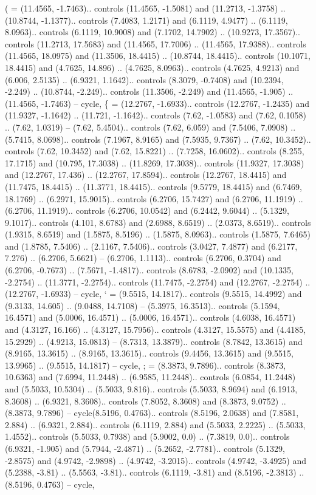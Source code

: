 {(} = {(11.4565, -1.7463).. controls (11.4565, -1.5081) and (11.2713, -1.3758) .. (10.8744, -1.1377).. controls (7.4083, 1.2171) and (6.1119, 4.9477) .. (6.1119, 8.0963).. controls (6.1119, 10.9008) and (7.1702, 14.7902) .. (10.9273, 17.3567).. controls (11.2713, 17.5683) and (11.4565, 17.7006) .. (11.4565, 17.9388).. controls (11.4565, 18.0975) and (11.3506, 18.4415) .. (10.8744, 18.4415).. controls (10.1071, 18.4415) and (4.7625, 14.896) .. (4.7625, 8.0963).. controls (4.7625, 4.9213) and (6.006, 2.5135) .. (6.9321, 1.1642).. controls (8.3079, -0.7408) and (10.2394, -2.249) .. (10.8744, -2.249).. controls (11.3506, -2.249) and (11.4565, -1.905) .. (11.4565, -1.7463) -- cycle},
{\{} = {(12.2767, -1.6933).. controls (12.2767, -1.2435) and (11.9327, -1.1642) .. (11.721, -1.1642).. controls (7.62, -1.0583) and (7.62, 0.1058) .. (7.62, 1.0319) -- (7.62, 5.4504).. controls (7.62, 6.059) and (7.5406, 7.0908) .. (5.7415, 8.0698).. controls (7.1967, 8.9165) and (7.5935, 9.7367) .. (7.62, 10.3452).. controls (7.62, 10.3452) and (7.62, 15.8221) .. (7.7258, 16.0602).. controls (8.255, 17.1715) and (10.795, 17.3038) .. (11.8269, 17.3038).. controls (11.9327, 17.3038) and (12.2767, 17.436) .. (12.2767, 17.8594).. controls (12.2767, 18.4415) and (11.7475, 18.4415) .. (11.3771, 18.4415).. controls (9.5779, 18.4415) and (6.7469, 18.1769) .. (6.2971, 15.9015).. controls (6.2706, 15.7427) and (6.2706, 11.1919) .. (6.2706, 11.1919).. controls (6.2706, 10.0542) and (6.2442, 9.6044) .. (5.1329, 9.1017).. controls (4.101, 8.6783) and (2.6988, 8.6519) .. (2.0373, 8.6519).. controls (1.9315, 8.6519) and (1.5875, 8.5196) .. (1.5875, 8.0963).. controls (1.5875, 7.6465) and (1.8785, 7.5406) .. (2.1167, 7.5406).. controls (3.0427, 7.4877) and (6.2177, 7.276) .. (6.2706, 5.6621) -- (6.2706, 1.1113).. controls (6.2706, 0.3704) and (6.2706, -0.7673) .. (7.5671, -1.4817).. controls (8.6783, -2.0902) and (10.1335, -2.2754) .. (11.3771, -2.2754).. controls (11.7475, -2.2754) and (12.2767, -2.2754) .. (12.2767, -1.6933) -- cycle},
{`} = {(9.5515, 14.1817).. controls (9.5515, 14.4992) and (9.3133, 14.605) .. (9.0488, 14.7108) -- (5.3975, 16.3513).. controls (5.1594, 16.4571) and (5.0006, 16.4571) .. (5.0006, 16.4571).. controls (4.6038, 16.4571) and (4.3127, 16.166) .. (4.3127, 15.7956).. controls (4.3127, 15.5575) and (4.4185, 15.2929) .. (4.9213, 15.0813) -- (8.7313, 13.3879).. controls (8.7842, 13.3615) and (8.9165, 13.3615) .. (8.9165, 13.3615).. controls (9.4456, 13.3615) and (9.5515, 13.9965) .. (9.5515, 14.1817) -- cycle},
{;} = {(8.3873, 9.7896).. controls (8.3873, 10.6363) and (7.6994, 11.2448) .. (6.9585, 11.2448).. controls (6.0854, 11.2448) and (5.5033, 10.5304) .. (5.5033, 9.816).. controls (5.5033, 8.9694) and (6.1913, 8.3608) .. (6.9321, 8.3608).. controls (7.8052, 8.3608) and (8.3873, 9.0752) .. (8.3873, 9.7896) -- cycle(8.5196, 0.4763).. controls (8.5196, 2.0638) and (7.8581, 2.884) .. (6.9321, 2.884).. controls (6.1119, 2.884) and (5.5033, 2.2225) .. (5.5033, 1.4552).. controls (5.5033, 0.7938) and (5.9002, 0.0) .. (7.3819, 0.0).. controls (6.9321, -1.905) and (5.7944, -2.4871) .. (5.2652, -2.7781).. controls (5.1329, -2.8575) and (4.9742, -2.9898) .. (4.9742, -3.2015).. controls (4.9742, -3.4925) and (5.2388, -3.81) .. (5.5563, -3.81).. controls (6.1119, -3.81) and (8.5196, -2.3813) .. (8.5196, 0.4763) -- cycle},
